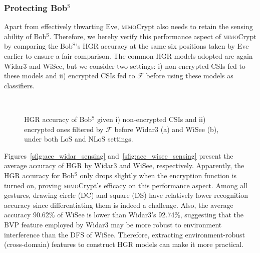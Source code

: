 \documentclass[conference,compsoc]{IEEEtran}
\newcommand{\sname}{\textsc{mimo}Crypt\xspace}
\begin{document}
\subsubsection{Protecting Bob$^{\mathrm{S}}$}\label{sssec:legalsensing}
%
Apart from effectively thwarting Eve, \sname also needs to retain the sensing ability of Bob$\mathrm{^S}$. Therefore, we hereby verify this performance aspect of \sname by comparing the Bob$^{\mathrm{S}}$'s HGR accuracy at the same six positions taken by Eve earlier to ensure a fair comparison. The common HGR models adopted are again Widar3 and WiSee, but we consider two settings: i) non-encrypted CSIs fed to these models and ii) encrypted CSIs fed to $\mathcal{F}$ before 
using these models as classifiers.
%
\begin{figure}[b]
	\setlength\abovecaptionskip{8pt}
	\vspace{-1.5ex}
	\centering
	\\
	\caption{HGR accuracy of Bob$\mathrm{^S}$ given i) non-encrypted CSIs and ii) encrypted ones filtered by $\mathcal{F}$ before Widar3 (a) and WiSee (b), under both LoS and NLoS settings.}
	\label{fig:overall_sensing}
	\vspace{-.5ex}
\end{figure}

%
Figures~\ref{sfig:acc_widar_sensing} and~\ref{sfig:acc_wisee_sensing} present the average accuracy of HGR by Widar3 and WiSee, respectively. 
Apparently, the HGR accuracy for Bob$^{\mathrm{S}}$ only drops slightly when the encryption function is turned on, proving \sname's efficacy on this performance aspect. Among all gestures, drawing circle (DC) and square (DS) have relatively lower recognition accuracy since differentiating them is indeed a challenge. Also, the average accuracy 90.62\% of WiSee is lower than Widar3's 92.74\%, suggesting that the BVP feature employed by Widar3 may be more robust to environment interference than the DFS of WiSee. Therefore, extracting environment-robust (cross-domain) features to construct HGR models can make it more practical.
\end{document}

